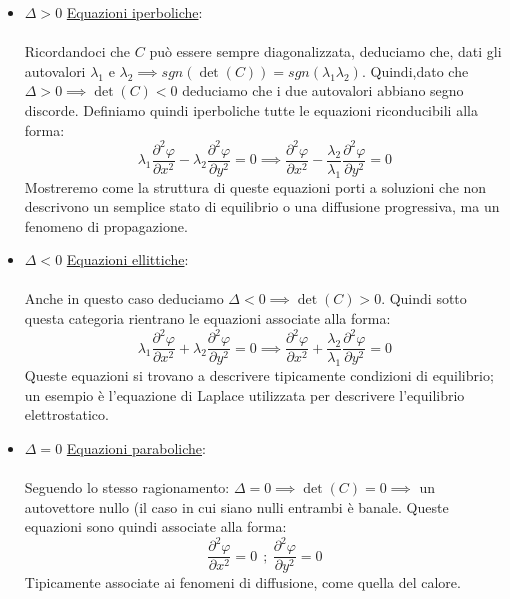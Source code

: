 \documentclass[a4paper,12pt]{report}
\newcommand{\lt}{<}
\newcommand{\gt}{>}
\newcommand{\pdd}[2]{\frac{\partial^2 #1}{\partial #2^2}}
\begin{document}
\begin{itemize}
    \item$\boxed{\Delta \gt0}$ \underline{Equazioni iperboliche}: 
    \\
    \\ Ricordandoci che $C$ può essere sempre diagonalizzata, deduciamo che, dati gli autovalori $\lambda_1$ e $\lambda_2\implies sgn(\det(C))=sgn(\lambda_1\lambda_2)$. Quindi,dato che $\Delta\gt 0\implies \det(C)\lt0$ deduciamo che i due autovalori abbiano segno discorde. Definiamo quindi iperboliche tutte le equazioni riconducibili alla forma: 
    \[\displaystyle\lambda_1\pdd{\varphi}{x}-\lambda_2\pdd{\varphi}{y}=0\implies \pdd{\varphi}{x}-\frac{\lambda_2}{\lambda_1}\pdd{\varphi}{y}=0\]
    Mostreremo come la struttura di queste equazioni porti a soluzioni che non descrivono un semplice stato di equilibrio o una diffusione progressiva, ma un fenomeno di propagazione.


   \item $\boxed{\Delta\lt0}$ \underline{Equazioni ellittiche}:
    \\
    \\ Anche in questo caso deduciamo $\Delta\lt 0\implies \det(C)\gt 0$. Quindi sotto questa categoria rientrano le equazioni associate alla forma:
    \[\lambda_1\pdd{\varphi}{x}+\lambda_2\pdd{\varphi}{y}=0 \implies \pdd{\varphi}{x}+\frac{\lambda_2}{\lambda_1}\pdd{\varphi}{y}=0\]
    Queste equazioni si trovano a descrivere tipicamente condizioni di equilibrio; un esempio è l'equazione di Laplace utilizzata per descrivere l'equilibrio elettrostatico.


    \item $\boxed{\Delta=0}$ \underline{Equazioni paraboliche}: 
    \\
    \\ Seguendo lo stesso ragionamento: $\Delta =0\implies \det(C)=0\implies$ un autovettore nullo (il caso in cui siano nulli entrambi è banale. Queste equazioni sono quindi associate alla forma:
    \[\displaystyle\pdd{\varphi}{x}=0 \ \ ; \ \pdd{\varphi}{y}=0\]
    Tipicamente associate ai fenomeni di diffusione, come quella del calore.
   
\end{itemize}
\end{document}
